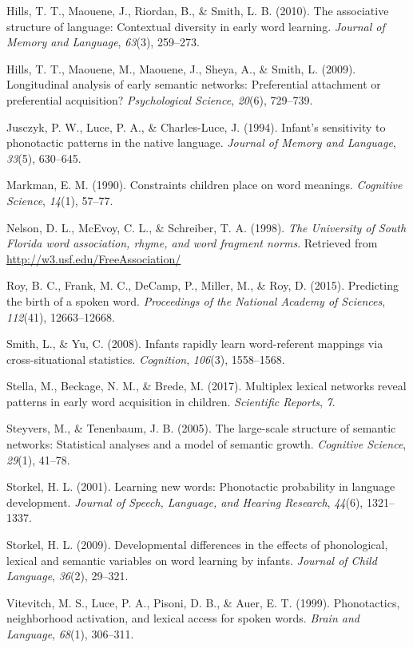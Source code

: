 \documentclass[english,floatsintext,man]{apa6}
\theoremstyle{definition}
\theoremstyle{definition}
\theoremstyle{definition}
\theoremstyle{remark}
\begin{document}
\hypertarget{ref-hills2010}{}
Hills, T. T., Maouene, J., Riordan, B., \& Smith, L. B. (2010). The
associative structure of language: Contextual diversity in early word
learning. \emph{Journal of Memory and Language}, \emph{63}(3), 259--273.

\hypertarget{ref-hills2009}{}
Hills, T. T., Maouene, M., Maouene, J., Sheya, A., \& Smith, L. (2009).
Longitudinal analysis of early semantic networks: Preferential
attachment or preferential acquisition? \emph{Psychological Science},
\emph{20}(6), 729--739.

\hypertarget{ref-jusczyk1994}{}
Jusczyk, P. W., Luce, P. A., \& Charles-Luce, J. (1994). Infant's
sensitivity to phonotactic patterns in the native language.
\emph{Journal of Memory and Language}, \emph{33}(5), 630--645.

\hypertarget{ref-markman90}{}
Markman, E. M. (1990). Constraints children place on word meanings.
\emph{Cognitive Science}, \emph{14}(1), 57--77.

\hypertarget{ref-nelson1998}{}
Nelson, D. L., McEvoy, C. L., \& Schreiber, T. A. (1998). \emph{The
University of South Florida word association, rhyme, and word fragment
norms}. Retrieved from \url{http://w3.usf.edu/FreeAssociation/}

\hypertarget{ref-roy2015}{}
Roy, B. C., Frank, M. C., DeCamp, P., Miller, M., \& Roy, D. (2015).
Predicting the birth of a spoken word. \emph{Proceedings of the National
Academy of Sciences}, \emph{112}(41), 12663--12668.

\hypertarget{ref-smith2008}{}
Smith, L., \& Yu, C. (2008). Infants rapidly learn word-referent
mappings via cross-situational statistics. \emph{Cognition},
\emph{106}(3), 1558--1568.

\hypertarget{ref-stella2017}{}
Stella, M., Beckage, N. M., \& Brede, M. (2017). Multiplex lexical
networks reveal patterns in early word acquisition in children.
\emph{Scientific Reports}, \emph{7}.

\hypertarget{ref-steyvers2005}{}
Steyvers, M., \& Tenenbaum, J. B. (2005). The large-scale structure of
semantic networks: Statistical analyses and a model of semantic growth.
\emph{Cognitive Science}, \emph{29}(1), 41--78.

\hypertarget{ref-storkel2001}{}
Storkel, H. L. (2001). Learning new words: Phonotactic probability in
language development. \emph{Journal of Speech, Language, and Hearing
Research}, \emph{44}(6), 1321--1337.

\hypertarget{ref-storkel2009}{}
Storkel, H. L. (2009). Developmental differences in the effects of
phonological, lexical and semantic variables on word learning by
infants. \emph{Journal of Child Language}, \emph{36}(2), 29--321.

\hypertarget{ref-vitevitch1999}{}
Vitevitch, M. S., Luce, P. A., Pisoni, D. B., \& Auer, E. T. (1999).
Phonotactics, neighborhood activation, and lexical access for spoken
words. \emph{Brain and Language}, \emph{68}(1), 306--311.
\end{document}
